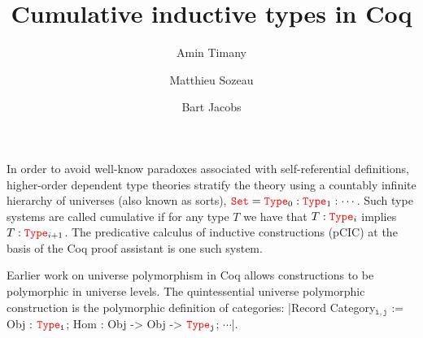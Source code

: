 \documentclass{easychair}
\title{Cumulative inductive types in Coq}
\author{
Amin Timany\inst{1}
\and
Matthieu Sozeau\inst{2}
\and
Bart Jacobs\inst{1}
}
\institute{
imec-Distrinet, KU Leuven, Belgium, \email{firstname.lastname@cs.kuleuven.be}
\and
Inria Paris \& IRIF, France, \email{matthieu.sozeau@inria.fr}
 }
\newcommand{\Type}[1]{{\color{red} \mathtt{Type}}_{#1}}
\newcommand{\Set}{{\color{red} \mathtt{Set}}}
\begin{document}
\maketitle

In order to avoid well-know paradoxes associated with self-referential
definitions, higher-order dependent type theories stratify the theory using a
countably infinite hierarchy of universes (also known as sorts),
$\Set = \Type{0} : \Type{1} : \cdots$. Such type systems are called
cumulative if for any type $T$ we have that $T : \Type{i}$ implies
$T : \Type{i+1}$. The predicative calculus of inductive constructions
(pCIC) \cite{coq, DBLP:journals/corr/abs-1111-0123} at the basis of the Coq proof assistant is one such
system.

Earlier work \cite{DBLP:conf/itp/SozeauT14} on universe polymorphism
in Coq allows constructions to be polymorphic in universe levels.  The
quintessential universe polymorphic construction is the polymorphic definition of
categories:
\Coqe|Record Category$_{\mathtt{i, j}}$ := {Obj : $\Type{\mathtt{i}}$; Hom : Obj -> Obj -> $\Type{\mathtt{j}}$; $\cdots$}|.\footnotemark{}
\end{document}

